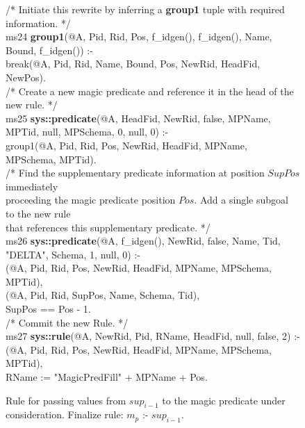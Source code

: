 \begin{figure}[!t]
\ssp
\centering
\begin{boxedminipage}{\linewidth}
/* Initiate this rewrite by inferring a {\bf group1} tuple with required information. */ \\
ms24 {\bf group1}(@A, Pid, Rid, Pos, f\_idgen(), f\_idgen(), Name, Bound, f\_idgen()) :- \\
\datalogspace break(@A, Pid, Rid, Name, Bound, Pos, NewRid, HeadFid, NewPos). \\
	
/* Create a new magic predicate and reference it in the head of the new rule. */ \\
ms25 {\bf sys::predicate}(@A, HeadFid, NewRid, false, MPName, MPTid, null, MPSchema, 0, null, 0) :- \\
\datalogspace group1(@A, Pid, Rid, Pos, NewRid, HeadFid, MPName, MPSchema, MPTid). \\
	
/* Find the supplementary predicate information at position $SupPos$ immediately \\
proceeding the magic predicate position $Pos$. Add a single subgoal to the new rule \\
that references this supplementary predicate. */ \\
ms26 {\bf sys::predicate}(@A, f\_idgen(), NewRid, false, Name, Tid, "DELTA", Schema, 1, null, 0) :- \\
(@A, Pid, Rid, Pos, NewRid, HeadFid, MPName, MPSchema, MPTid), \\
(@A, Pid, Rid, SupPos, Name, Schema, Tid), \\
\datalogspace SupPos == Pos - 1. \\
	
/* Commit the new Rule. */ \\
ms27 {\bf sys::rule}(@A, NewRid, Pid, RName, HeadFid, null, false, 2) :- \\
(@A, Pid, Rid, Pos, NewRid, HeadFid, MPName, MPSchema, MPTid), \\
\datalogspace RName := "MagicPredFill" + MPName + Pos. \\

\end{boxedminipage}
\caption{\label{ch:evita:fig:mpgoal} Rule for passing values from $sup_{i-1}$ to the 
magic predicate under consideration. Finalize rule: $m_p$ :- $sup_{i-1}$.}
\end{figure}

